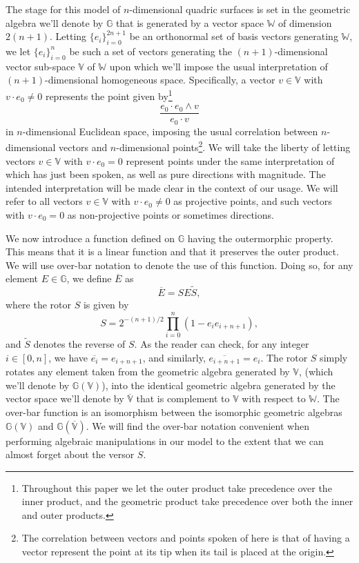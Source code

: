 \documentclass{birkjour}
\theoremstyle{definition}
\theoremstyle{remark}
\numberwithin{equation}{section}
\newcommand{\G}{\mathbb{G}}
\newcommand{\V}{\mathbb{V}}
\newcommand{\W}{\mathbb{W}}
\begin{document}
The stage for this model of $n$-dimensional quadric surfaces is set in the geometric
algebra we'll denote by $\G$ that is generated by a vector space $\W$ of dimension
$2(n+1)$.  Letting $\{e_i\}_{i=0}^{2n+1}$ be an orthonormal set of basis vectors
generating $\W$, we let $\{e_i\}_{i=0}^n$ be such a set of vectors generating
the $(n+1)$-dimensional vector sub-space $\V$ of $\W$ upon which we'll impose the
usual interpretation of $(n+1)$-dimensional homogeneous space.  Specifically,
a vector $v\in\V$ with $v\cdot e_0\neq 0$ represents the point given by\footnote{Throughout this
paper we let the outer product take precedence over the inner product, and the geometric product
take precedence over both the inner and outer products.}
\begin{equation}
\frac{e_0\cdot e_0\wedge v}{e_0\cdot v}
\end{equation}
in $n$-dimensional Euclidean space, imposing the usual correlation between $n$-dimensional
vectors and $n$-dimensional points\footnote{The correlation between
vectors and points spoken of here is that of having a vector represent the point
at its tip when its tail is placed at the origin.}.  We will take the liberty of letting vectors $v\in\V$ with $v\cdot e_0=0$
represent points under the same interpretation of which has just been spoken, as
well as pure directions with magnitude.  The intended interpretation will be made clear
in the context of our usage.  We will refer to all vectors $v\in\V$ with $v\cdot e_0\neq 0$
as projective points, and such vectors with $v\cdot e_0=0$ as non-projective points
or sometimes directions.

We now introduce a function defined on $\G$ having the outermorphic property.
This means that it is a linear function and that it preserves the outer product.  We will
use over-bar notation to denote the use of this function.  Doing so, for any
element $E\in\G$, we define $\overline{E}$ as
\begin{equation}
\overline{E} = SE\tilde{S},
\end{equation}
where the rotor $S$ is given by
\begin{equation}
S = 2^{-(n+1)/2}\prod_{i=0}^n\left(1-e_ie_{i+n+1}\right),
\end{equation}
and $\tilde{S}$ denotes the reverse of $S$.
As the reader can check, for any integer $i\in[0,n]$, we have $\overline{e_i}=e_{i+n+1}$,
and similarly, $\overline{e_{i+n+1}}=e_i$.
The rotor $S$ simply rotates any element taken from the geometric algebra generated
by $\V$, (which we'll denote by $\G(\V)$), into the identical geometric
algebra generated by the vector
space we'll denote by $\overline{\V}$ that is complement to $\V$ with respect to $\W$.
The over-bar function is an isomorphism between the isomorphic geometric algebras $\G(\V)$ and $\G(\overline{\V})$.
We will find the over-bar notation convenient when performing algebraic manipulations in our model
to the extent that we can almost forget about the versor $S$.
\end{document}
